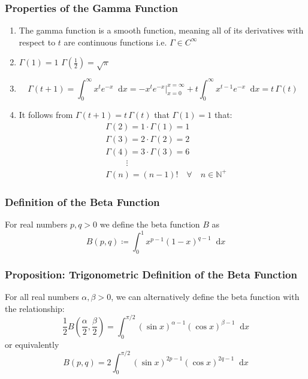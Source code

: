 \documentclass[11pt, a4paper]{article}
\newcommand{\diff}{\mathop{}\!\mathrm{d}} %
\begin{document}
\subsubsection{Properties of the Gamma Function}
\begin{enumerate}
	\item The gamma function is a smooth function, meaning all of its derivatives with respect to $ t $ are continuous functions i.e. $ \Gamma \in C^{\infty} $
	
	\item $ \Gamma(1) = 1 $ \qquad $ \Gamma \left( \frac{1}{2}\right) = \sqrt{\pi}$
	
	\item 
	\begin{equation*}
		\Gamma(t+1) = \int_{0}^{\infty} x^t e^{-x} \diff x = -x^t e^{-x} \Big|_{x=0}^{x=\infty} + t\int_{0}^{\infty}x^{t-1}e^{-x} \diff x = t\,\Gamma(t)
	\end{equation*}
	
	\item It follows from $ \Gamma(t+1) = t\,\Gamma(t) $ that $ \Gamma(1) = 1 $ that:
	\begin{align*}
		&\Gamma(2) = 1 \cdot \Gamma(1) = 1\\
		&\Gamma(3) = 2 \cdot \Gamma(2) = 2\\
		&\Gamma(4) = 3 \cdot \Gamma(3) = 6\\
		&\;\,\qquad\vdots\\ %
		&\Gamma(n) = (n-1)! \quad \forall \quad n\in\mathbb{N}^+
	\end{align*}
	
\end{enumerate}




\subsubsection{Definition of the Beta Function}
For real numbers $ p, q > 0 $ we define the beta function $ B $ as
\begin{equation*}
	B(p, q) \coloneqq \int_{0}^{1}x^{p-1}(1-x)^{q-1}\diff x
\end{equation*}

\subsubsection{Proposition: Trigonometric Definition of the Beta Function}
For all real numbers $ \alpha, \beta > 0 $, we can alternatively define the beta function with the relationship:
\begin{equation*}
	\frac{1}{2}B \left (\frac{\alpha}{2}, \frac{\beta}{2} \right ) = \int_{0}^{\pi/2} \left(\sin x\right)^{\alpha - 1} \left(\cos x\right)^{\beta - 1} \diff x
\end{equation*}
or equivalently
\begin{equation*}
	B(p, q) = 2\int_{0}^{\pi/2} \left(\sin x\right)^{2p - 1} \left(\cos x\right)^{2q - 1} \diff x
\end{equation*}
\end{document}
